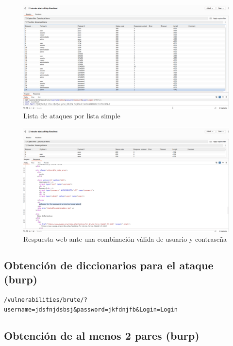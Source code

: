 \documentclass[letter,12pt]{article}
\begin{document}
\begin{figure}
    \centering
    \includegraphics[width=1\linewidth]{identificaryobtenercamposburp/Captura desde 2025-10-01 23-26-54.png}
    \caption{Lista de ataques por lista simple}
    \label{fig:ataqueslistasimple}
\end{figure}
\begin{figure}
    \centering
    \includegraphics[width=1\linewidth]{identificaryobtenercamposburp/Captura desde 2025-10-01 23-27-12.png}
    \caption{Respuesta web ante una combinación válida de usuario y contraseña}
    \label{fig:intrudersuccesfulattack}
\end{figure}
\subsection{Obtención de diccionarios para el ataque (burp)}
\begin{verbatim}
/vulnerabilities/brute/?username=jdsfnjdsbsj&password=jkfdnjfb&Login=Login
\end{verbatim}
\subsection{Obtención de al menos 2 pares (burp)}
\end{document}
